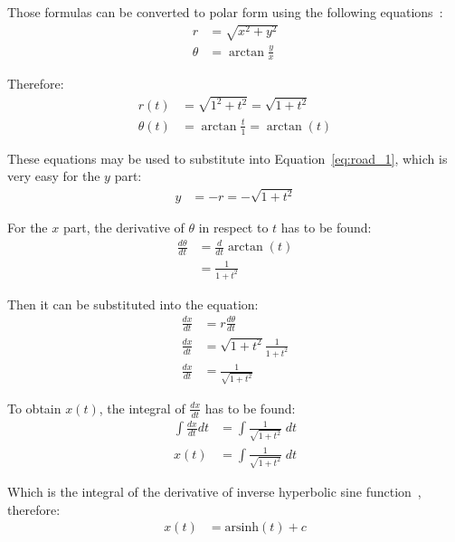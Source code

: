 \documentclass[12pt]{article}
\begin{document}
        Those formulas can be converted to polar form using the following equations~\cite{polar_rectangular}:
        \begin{align}
            r &= \sqrt{x^2 + y^2} \\
            \theta &= \arctan\frac{y}{x}
        \end{align}

        Therefore:
        \begin{align}
            r(t) &= \sqrt{1^2 + t^2} = \sqrt{1+t^2} \\
            \theta(t) &= \arctan\frac{t}{1} = \arctan(t)
        \end{align}

        These equations may be used to substitute into Equation~\ref{eq:road_1}, which is very easy for the $y$ part:
        \begin{align}
            y &= -r = -\sqrt{1+t^2}
        \end{align}

        For the $x$ part, the derivative of $\theta$ in respect to $t$ has to be found:
        \begin{align}
            \frac{d\theta}{dt} &= \frac{d}{dt} \arctan(t) \\
            &= \frac{1}{1+t^2}
        \end{align}

        Then it can be substituted into the equation:
        \begin{align}
            \frac{dx}{dt} &= r \frac{d\theta}{dt} \\
            \frac{dx}{dt} &= \sqrt{1+t^2} \frac{1}{1+t^2} \\
            \frac{dx}{dt} &= \frac{1}{\sqrt{1+t^2}}
        \end{align}

        To obtain $x(t)$, the integral of $\frac{dx}{dt}$ has to be found:
        \begin{align}
            \int \frac{dx}{dt} dt &= \int \frac{1}{\sqrt{1+t^2}} \;dt \\
            x(t) &= \int \frac{1}{\sqrt{1+t^2}} \;dt
        \end{align}

        Which is the integral of the derivative of inverse hyperbolic sine function~\cite{oxford_dict}, therefore:
        \begin{align}
            x(t) &= \text{arsinh}(t) + c 
        \end{align}
\end{document}

